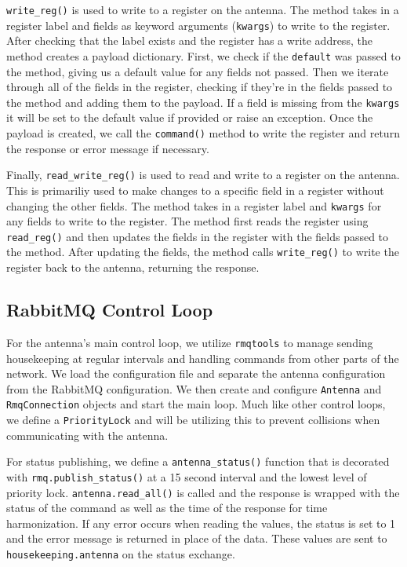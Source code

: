 \texttt{write\_reg()} is used to write to a register on the antenna.
The method takes in a register label and fields as keyword arguments (\texttt{kwargs}) to write to the register.
After checking that the label exists and the register has a write address, the method creates a payload dictionary. 
First, we check if the \texttt{default}  was passed to the method, giving us a default value for any fields not passed.
Then we iterate through all of the fields in the register, checking if they're in the fields passed to the method and adding them to the payload.
If a field is missing from the \texttt{kwargs} it will be set to the default value if provided or raise an exception. 
Once the payload is created, we call the \texttt{command()} method to write the register and return the response or error message if necessary. 

Finally, \texttt{read\_write\_reg()} is used to read and write to a register on the antenna.
This is primariliy used to make changes to a specific field in a register without changing the other fields.
The method takes in a register label and \texttt{kwargs} for any fields to write to the register.
The method first reads the register using \texttt{read\_reg()} and then updates the fields in the register with the fields passed to the method.
After updating the fields, the method calls \texttt{write\_reg()} to write the register back to the antenna, returning the response. 

\subsection{RabbitMQ Control Loop}
For the antenna's main control loop, we utilize \texttt{rmqtools} to manage sending housekeeping at regular intervals and handling commands from other parts of the network.
We load the configuration file and separate the antenna configuration from the RabbitMQ configuration.
We then create and configure \texttt{Antenna} and \texttt{RmqConnection} objects and start the main loop.
Much like other control loops, we define a \texttt{PriorityLock} and will be utilizing this to prevent collisions when communicating with the antenna. 

For status publishing, we define a \texttt{antenna\_status()} function that is decorated with \texttt{rmq.publish\_status()} at a 15 second interval and the lowest level of priority lock. 
\texttt{antenna.read\_all()} is called and the response is wrapped with the status of the command as well as the time of the response for time harmonization.
If any error occurs when reading the values, the status is set to 1 and the error message is returned in place of the data.
These values are sent to \texttt{housekeeping.antenna} on the status exchange.

